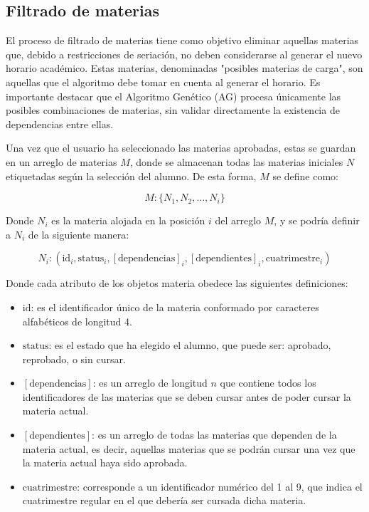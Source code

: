 \subsection{Filtrado de materias} \label{filtrado_de_materias}
El proceso de filtrado de materias tiene como objetivo eliminar aquellas materias que, debido a restricciones de seriación, no deben considerarse al generar el nuevo horario académico. Estas materias, denominadas "posibles materias de carga", son aquellas que el algoritmo debe tomar en cuenta al generar el horario. Es importante destacar que el Algoritmo Genético (AG) procesa únicamente las posibles combinaciones de materias, sin validar directamente la existencia de dependencias entre ellas. %

Una vez que el usuario ha seleccionado las materias aprobadas, estas se guardan en un arreglo de materias \( M \), donde se almacenan todas las materias iniciales \( N \) etiquetadas según la selección del alumno. De esta forma, \( M \) se define como: %

\begin{equation}
    M : \{ N_1, N_2, \dots, N_i \}
    \label{eq:arreglo_materias_sin_procesar}
\end{equation} 

\noindent
Donde \( N_i \) es la materia alojada en la posición \( i \) del arreglo \( M \), y se podría definir a \( N_i \) de la siguiente manera: %

\begin{equation}
    N_i : (\text{id}_i, \text{status}_i, [\text{dependencias}]_i, [\text{dependientes}]_i, \text{cuatrimestre}_i)
    \label{eq:atributos_materia}
\end{equation} 

\noindent
Donde cada atributo de los objetos materia obedece las siguientes definiciones:
\begin{itemize}
    \item \( \text{id} \): es el identificador único de la materia conformado por caracteres alfabéticos de longitud 4.
    \item \( \text{status} \): es el estado que ha elegido el alumno, que puede ser: aprobado, reprobado, o sin cursar.
    \item \( [\text{dependencias}] \): es un arreglo de longitud \( n \) que contiene todos los identificadores de las materias que se deben cursar antes de poder cursar la materia actual.
    \item \( [\text{dependientes}] \): es un arreglo de todas las materias que dependen de la materia actual, es decir, aquellas materias que se podrán cursar una vez que la materia actual haya sido aprobada.
    \item \( \text{cuatrimestre} \): corresponde a un identificador numérico del 1 al 9, que indica el cuatrimestre regular en el que debería ser cursada dicha materia.
\end{itemize}


